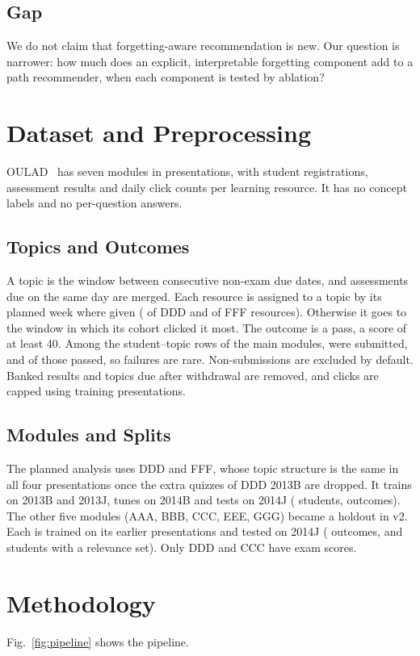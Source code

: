 \documentclass[conference]{IEEEtran}
\begin{document}
\subsection{Gap}
We do not claim that forgetting-aware recommendation is new. Our question is narrower: how much does an explicit, interpretable forgetting component add to a path recommender, when each component is tested by ablation?

\section{Dataset and Preprocessing}
OULAD~\cite{kuzilek2017,oulad_uci} has seven modules in \NPresentations{} presentations, with \NRegistrations{} student registrations, \NAssessRecords{} assessment results and daily click counts per learning resource. It has no concept labels and no per-question answers.

\subsection{Topics and Outcomes}
A topic is the window between consecutive non-exam due dates, and assessments due on the same day are merged. Each resource is assigned to a topic by its planned week where given (\WeekMapDDD{} of DDD and \WeekMapFFF{} of FFF resources). Otherwise it goes to the window in which its cohort clicked it most. The outcome is a pass, a score of at least 40. Among the student--topic rows of the main modules, \SubmitRate{} were submitted, and \PassRate{} of those passed, so failures are rare. Non-submissions are excluded by default. Banked results and topics due after withdrawal are removed, and clicks are capped using training presentations.

\subsection{Modules and Splits}
The planned analysis uses DDD and FFF, whose topic structure is the same in all four presentations once the extra quizzes of DDD 2013B are dropped. It trains on 2013B and 2013J, tunes on 2014B and tests on 2014J (\TestStudents{} students, \TestRows{} outcomes). The other five modules (AAA, BBB, CCC, EEE, GGG) became a holdout in v2. Each is trained on its earlier presentations and tested on 2014J (\HoldRows{} outcomes, and \HoldStudents{} students with a relevance set). Only DDD and CCC have exam scores.

\section{Methodology}
Fig.~\ref{fig:pipeline} shows the pipeline.
\end{document}
